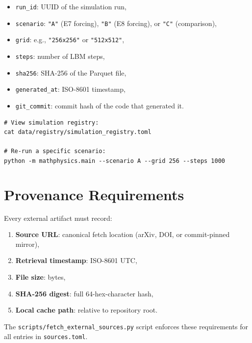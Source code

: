 \begin{itemize}
    \item \texttt{run\_id}: UUID of the simulation run,
    \item \texttt{scenario}: \texttt{"A"} (E7 forcing), \texttt{"B"}
          (E8 forcing), or \texttt{"C"} (comparison),
    \item \texttt{grid}: e.g., \texttt{"256x256"} or \texttt{"512x512"},
    \item \texttt{steps}: number of LBM steps,
    \item \texttt{sha256}: SHA-256 of the Parquet file,
    \item \texttt{generated\_at}: ISO-8601 timestamp,
    \item \texttt{git\_commit}: commit hash of the code that generated it.
\end{itemize}

\begin{verbatim}
# View simulation registry:
cat data/registry/simulation_registry.toml

# Re-run a specific scenario:
python -m mathphysics.main --scenario A --grid 256 --steps 1000
\end{verbatim}

\section{Provenance Requirements}
\label{app:provenance}

Every external artifact must record:
\begin{enumerate}
    \item \textbf{Source URL}: canonical fetch location (arXiv, DOI, or
          commit-pinned mirror),
    \item \textbf{Retrieval timestamp}: ISO-8601 UTC,
    \item \textbf{File size}: bytes,
    \item \textbf{SHA-256 digest}: full 64-hex-character hash,
    \item \textbf{Local cache path}: relative to repository root.
\end{enumerate}

The \texttt{scripts/fetch\_external\_sources.py} script enforces these
requirements for all entries in \texttt{sources.toml}.

